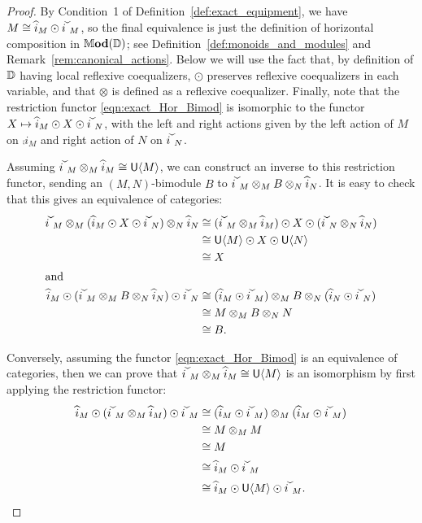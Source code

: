 \documentclass[11pt,oneside,article]{memoir}
\begin{document}
\begin{proof}
  By Condition~1 of Definition~\ref{def:exact_equipment}, we have $M\iso\comp{i}_M\odot\conj{i}_M$,
  so the final equivalence is just the definition of horizontal composition in $\mathbb{M}\mathbf{od}(\mathbb{D})$;
  see Definition~\ref{def:monoids_and_modules} and Remark~\ref{rem:canonical_actions}. Below we will
  use the fact that, by definition of $\mathbb{D}$ having local reflexive coequalizers, $\odot$
  preserves reflexive coequalizers in each variable, and that $\otimes$ is defined as a reflexive
  coequalizer. Finally, note that the restriction functor \eqref{eqn:exact_Hor_Bimod} is isomorphic
  to the functor $X\mapsto\comp{i}_M\odot X\odot\conj{i}_N$, with the left and right actions given
  by the left action of $M$ on $\comp{i}_M$ and right action of $N$ on $\conj{i}_N$.

  Assuming $\conj{i}_M\otimes_M\comp{i}_M\iso\unit\Col{M}$, we can construct an inverse to this
  restriction functor, sending an $(M,N)$-bimodule $B$ to $\conj{i}_M\otimes_M
  B\otimes_N\comp{i}_N$. It is easy to check that this gives an equivalence of categories:
  \begin{align*}
    \conj{i}_M\otimes_M (\comp{i}_M\odot X\odot\conj{i}_N)\otimes_N\comp{i}_N
      &\iso (\conj{i}_M\otimes_M\comp{i}_M)\odot X\odot (\conj{i}_N\otimes_N\comp{i}_N) \\
      &\iso \unit\Col{M}\odot X\odot \unit\Col{N} \\
      &\iso X \\
    \intertext{and}
    \comp{i}_M\odot (\conj{i}_M\otimes_M B\otimes_N\comp{i}_N)\odot \conj{i}_N
      &\iso (\comp{i}_M\odot\conj{i}_M)\otimes_M B\otimes_N (\comp{i}_N\odot\conj{i}_N) \\
      &\iso M\otimes_M B\otimes_N N \\
      &\iso B.
  \end{align*}

  Conversely, assuming the functor \eqref{eqn:exact_Hor_Bimod} is an equivalence of categories, then
  we can prove that $\conj{i}_M\otimes_M\comp{i}_M\iso\unit\Col{M}$ is an isomorphism by first
  applying the restriction functor:
  \begin{align*}
    \comp{i}_M\odot(\conj{i}_M\otimes_M\comp{i}_M)\odot\conj{i}_M
      &\iso (\comp{i}_M\odot\conj{i}_M)\otimes_M(\comp{i}_M\odot\conj{i}_M) \\
      &\iso M\otimes_M M \\
      &\iso M \\
      &\iso \comp{i}_M\odot\conj{i}_M \\
      &\iso \comp{i}_M\odot\unit\Col{M}\odot\conj{i}_M. \qedhere
  \end{align*}
\end{proof}
\end{document}
